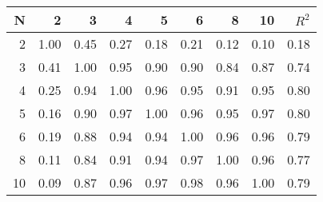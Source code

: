 \begin{tabular}{rrrrrrrrr}
\toprule
  N &     2 &     3 &     4 &     5 &     6 &     8 &    10 &  $R^2$ \\
\midrule
  2 &  1.00 &  0.45 &  0.27 &  0.18 &  0.21 &  0.12 &  0.10 &   0.18 \\
  3 &  0.41 &  1.00 &  0.95 &  0.90 &  0.90 &  0.84 &  0.87 &   0.74 \\
  4 &  0.25 &  0.94 &  1.00 &  0.96 &  0.95 &  0.91 &  0.95 &   0.80 \\
  5 &  0.16 &  0.90 &  0.97 &  1.00 &  0.96 &  0.95 &  0.97 &   0.80 \\
  6 &  0.19 &  0.88 &  0.94 &  0.94 &  1.00 &  0.96 &  0.96 &   0.79 \\
  8 &  0.11 &  0.84 &  0.91 &  0.94 &  0.97 &  1.00 &  0.96 &   0.77 \\
 10 &  0.09 &  0.87 &  0.96 &  0.97 &  0.98 &  0.96 &  1.00 &   0.79 \\
\bottomrule
\end{tabular}
